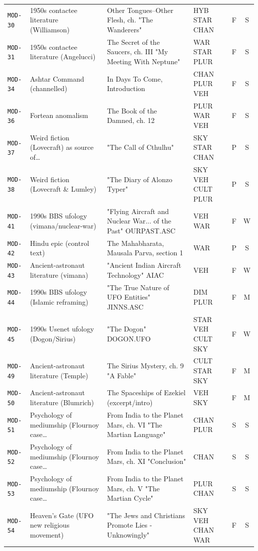 \documentclass[11pt,a4paper]{article}
\begin{document}
\begin{longtable}{@{}p{1.6cm}p{3.6cm}p{6.9cm}p{2.1cm}cc@{}}
\texttt{MOD-30} & 1950s contactee literature (Williamson) & Other Tongues--Other Flesh, ch. "The Wanderers" & HYB STAR CHAN & F & S \\
\texttt{MOD-31} & 1950s contactee literature (Angelucci) & The Secret of the Saucers, ch. III "My Meeting With Neptune" & WAR STAR PLUR & F & S \\
\texttt{MOD-34} & Ashtar Command (channelled) & In Days To Come, Introduction & CHAN PLUR VEH & F & S \\
\texttt{MOD-36} & Fortean anomalism & The Book of the Damned, ch. 12 & PLUR WAR VEH & F & S \\
\texttt{MOD-37} & Weird fiction (Lovecraft) as source of… & "The Call of Cthulhu" & SKY STAR CHAN & P & S \\
\texttt{MOD-38} & Weird fiction (Lovecraft \& Lumley) & "The Diary of Alonzo Typer" & SKY VEH CULT PLUR & P & S \\
\texttt{MOD-41} & 1990s BBS ufology (vimana/nuclear-war) & "Flying Aircraft and Nuclear War... of the Past" OURPAST.ASC & VEH WAR & F & W \\
\texttt{MOD-42} & Hindu epic (control text) & The Mahabharata, Mausala Parva, section 1 & WAR & P & S \\
\texttt{MOD-43} & Ancient-astronaut literature (vimana) & "Ancient Indian Aircraft Technology" AIAC & VEH & F & W \\
\texttt{MOD-44} & 1990s BBS ufology (Islamic reframing) & "The True Nature of UFO Entities" JINNS.ASC & DIM PLUR & F & M \\
\texttt{MOD-45} & 1990s Usenet ufology (Dogon/Sirius) & "The Dogon" DOGON.UFO & STAR VEH CULT SKY & F & W \\
\texttt{MOD-49} & Ancient-astronaut literature (Temple) & The Sirius Mystery, ch. 9 "A Fable" & CULT STAR SKY & F & M \\
\texttt{MOD-50} & Ancient-astronaut literature (Blumrich) & The Spaceships of Ezekiel (excerpt/intro) & VEH SKY & F & M \\
\texttt{MOD-51} & Psychology of mediumship (Flournoy case… & From India to the Planet Mars, ch. VI "The Martian Language" & CHAN PLUR & S & S \\
\texttt{MOD-52} & Psychology of mediumship (Flournoy case… & From India to the Planet Mars, ch. XI "Conclusion" & CHAN & S & S \\
\texttt{MOD-53} & Psychology of mediumship (Flournoy case… & From India to the Planet Mars, ch. V "The Martian Cycle" & PLUR CHAN & S & S \\
\texttt{MOD-54} & Heaven's Gate (UFO new religious movement) & "The Jews and Christians Promote Lies - Unknowingly" & SKY VEH CHAN WAR & F & S \\
\end{longtable}\normalsize
\end{document}
